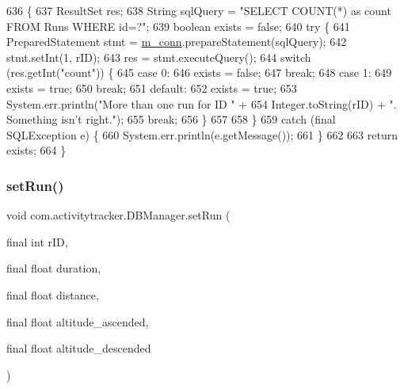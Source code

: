\begin{DoxyCode}
636                                             \{
637         ResultSet res;
638         String sqlQuery = \textcolor{stringliteral}{"SELECT COUNT(*) as count FROM Runs WHERE id=?"};
639         \textcolor{keywordtype}{boolean} exists = \textcolor{keyword}{false};
640         \textcolor{keywordflow}{try} \{
641             PreparedStatement stmt = \mbox{\hyperlink{classcom_1_1activitytracker_1_1_d_b_manager_a064088d13ac09eb147fdc19268771521}{m\_conn}}.prepareStatement(sqlQuery);
642             stmt.setInt(1, rID);
643             res = stmt.executeQuery();
644             \textcolor{keywordflow}{switch} (res.getInt(\textcolor{stringliteral}{"count"})) \{
645                 \textcolor{keywordflow}{case} 0:
646                     exists = \textcolor{keyword}{false};
647                     \textcolor{keywordflow}{break};
648                 \textcolor{keywordflow}{case} 1:
649                     exists = \textcolor{keyword}{true};
650                     \textcolor{keywordflow}{break};
651                 \textcolor{keywordflow}{default}:
652                     exists = \textcolor{keyword}{true};
653                     System.err.println(\textcolor{stringliteral}{"More than one run for ID "} +
654                             Integer.toString(rID) + \textcolor{stringliteral}{". Something isn't right."});
655                     \textcolor{keywordflow}{break};
656             \}
657 
658         \}
659         \textcolor{keywordflow}{catch} (\textcolor{keyword}{final} SQLException e) \{
660             System.err.println(e.getMessage());
661         \}
662 
663         \textcolor{keywordflow}{return} exists;
664     \}
\end{DoxyCode}
\mbox{\label{classcom_1_1activitytracker_1_1_d_b_manager_a72282377a552ce4ce371abff02e312f2}} 
\subsubsection{\texorpdfstring{set\+Run()}{setRun()}}
{\footnotesize\ttfamily void com.\+activitytracker.\+D\+B\+Manager.\+set\+Run (\begin{DoxyParamCaption}\item[{final int}]{r\+ID,  }\item[{final float}]{duration,  }\item[{final float}]{distance,  }\item[{final float}]{altitude\+\_\+ascended,  }\item[{final float}]{altitude\+\_\+descended }\end{DoxyParamCaption})}

